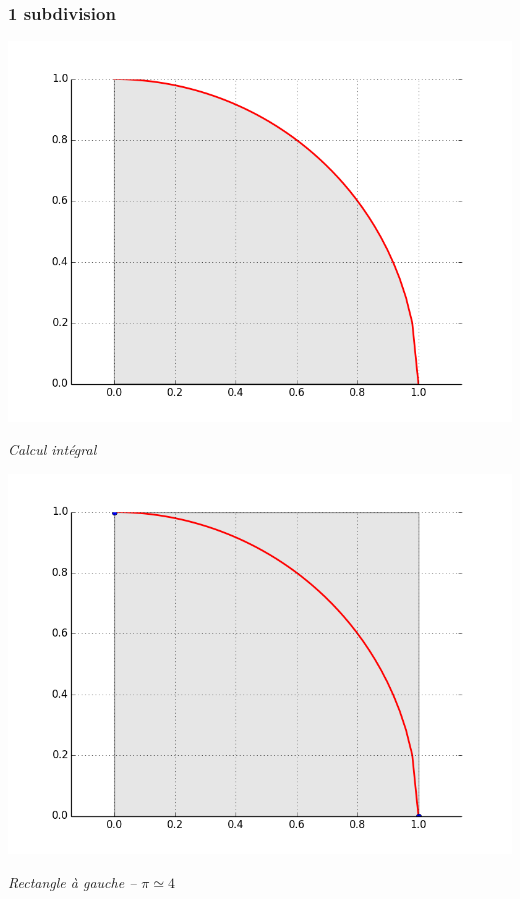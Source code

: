 \documentclass[10pt]{article}
\begin{document}
\subsubsection*{1 subdivision}

\begin{minipage}[c]{.24\linewidth}
\begin{center}
\includegraphics[width=.99\textwidth]{images/CourbesPython/pi_courbe}

\textit{Calcul intégral}
\end{center}
\end{minipage}\hfill
\begin{minipage}[c]{.24\linewidth}
\begin{center}
\includegraphics[width=.99\textwidth]{images/CourbesPython/pi_rect_g_1}

\textit{Rectangle à gauche -- $\pi \simeq 4$  }
\end{center}
\end{minipage}\hfill
\end{document}
